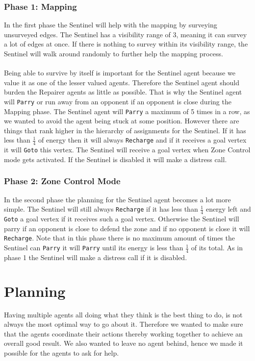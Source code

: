 \documentclass[11pt]{article}
\begin{document}
\subsubsection*{Phase 1: Mapping}
In the first phase the Sentinel will help with the mapping by surveying unsurveyed edges. The Sentinel has a visibility range of 3, meaning it can survey a lot of edges at once. If there is nothing to survey within its visibility range, the Sentinel will walk around randomly to further help the mapping process.\\
\\
Being able to survive by itself is important for the Sentinel agent because we value it as one of the lesser valued agents. Therefore the Sentinel agent should burden the Repairer agents as little as possible. That is why the Sentinel agent will {\tt Parry} or run away from an opponent if an opponent is close during the Mapping phase. The Sentinel agent will {\tt Parry} a maximum of 5 times in a row, as we wanted to avoid the agent being stuck at some position. However there are things that rank higher in the hierarchy of assignments for the Sentinel. If it has less than $\frac{1}{4}$ of energy then it will always {\tt Recharge} and if it receives a goal vertex it will {\tt Goto} this vertex. The Sentinel will receive a goal vertex when Zone Control mode gets activated. If the Sentinel is disabled it will make a distress call.
 
\subsubsection*{Phase 2: Zone Control Mode}
In the second phase the planning for the Sentinel agent becomes a lot more simple. The Sentinel will still always {\tt Recharge} if it has less than $\frac{1}{4}$ energy left and {\tt Goto} a goal vertex if it receives such a goal vertex. Otherwise the Sentinel will parry if an opponent is close to defend the zone and if no opponent is close it will {\tt Recharge}. Note that in this phase there is no maximum amount of times the Sentinel can {\tt Parry} it will {\tt Parry} until its energy is less than $\frac{1}{4}$ of its total. As in phase 1 the Sentinel will make a distress call if it is disabled.

\section{Planning}
Having multiple agents all doing what they think is the best thing to do, is not always the most optimal way to go about it. Therefore we wanted to make sure that the agents coordinate their actions thereby working together to achieve an overall good result. We also wanted to leave no agent behind, hence we made it possible for the agents to ask for help.
\end{document}
